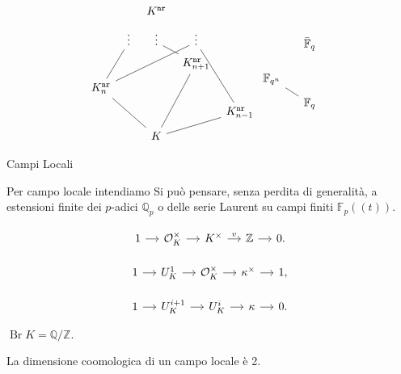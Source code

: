 \documentclass{beamer}
\newcommand{\Z}{\mathbb{Z}}
\newcommand{\Q}{\mathbb{Q}}
\newcommand{\F}{\mathbb{F}}
\newcommand{\K}{K}
\DeclareMathOperator{\Br}{Br}
\begin{document}
\begin{frame}[fragile]
	\[ \begin{tikzcd}[row sep = tiny, column sep = tiny]
	&&K^\mathtt{nr}&& \\
	&\vdots&\vdots&\vdots& \\
	&&&K^\mathtt{nr}_{n+1}\arrow[dash]{dddl}\arrow[dash]{ul}& \\
	K^\mathtt{nr}_n\arrow[dash]{ddrr}\arrow[dash]{uur}\arrow[dash]{uurrr}&&&&\\
	&&&&K^\mathtt{nr}_{n-1}\arrow[dash]{dll}\arrow[dash]{uuul} \\
	&& K &&
	\end{tikzcd}
	
	\begin{tikzcd}[row sep = tiny, column sep = tiny]
	&&\bar{\F}_q&& \\
	&&&& \\
	&&&& \\
	\F_{q^n} \arrow[dash]{drr}&&&& \\
	&& \F_q &&
	\end{tikzcd}\]
\end{frame}

\begin{frame}[fragile]{Campi Locali}

Per campo locale intendiamo  Si può pensare, senza perdita di generalità, a estensioni finite dei $ p $-adici $ \Q_p $ o delle serie Laurent su campi finiti $ \F_p((t)) $.

\begin{equation}\label{local1}
\begin{tikzcd}[column sep = small]
1 \rar
& \mathcal{O}_{\K}^\times \rar
& \K^\times \rar["v"]
& \Z \rar
& 0.
\end{tikzcd}
\end{equation}

\begin{equation}\label{local3}
\begin{tikzcd}[column sep = small]
1 \rar
& U_K^{1} \rar
& \mathcal{O}_{\K}^\times \rar
& \kappa^\times \rar
&1,
\end{tikzcd}
\end{equation}


\begin{equation}\label{local2}
\begin{tikzcd}[column sep = small]
1 \rar
& U_K^{i+1} \rar
& U_{K}^i \rar
& \kappa \rar
& 0.
\end{tikzcd}
\end{equation}

$ \Br K = \Q / \Z. $

\begin{theorem}\label{cdim2}
La dimensione coomologica di un campo locale è 2.
\end{theorem}

\end{frame}
\end{document}
